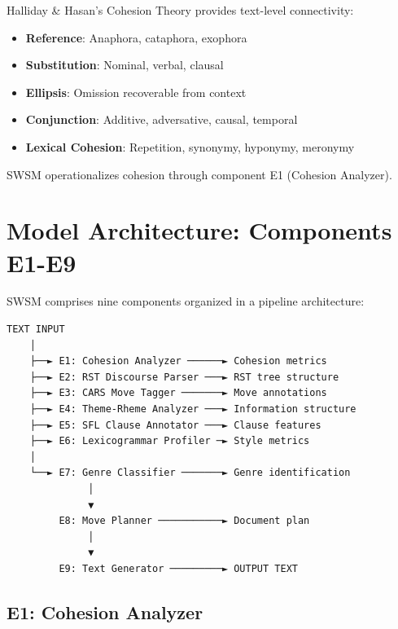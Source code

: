 Halliday \& Hasan's Cohesion Theory \citep{halliday1976cohesion} provides text-level connectivity:

\begin{itemize}
    \item \textbf{Reference}: Anaphora, cataphora, exophora
    \item \textbf{Substitution}: Nominal, verbal, clausal
    \item \textbf{Ellipsis}: Omission recoverable from context
    \item \textbf{Conjunction}: Additive, adversative, causal, temporal
    \item \textbf{Lexical Cohesion}: Repetition, synonymy, hyponymy, meronymy
\end{itemize}

SWSM operationalizes cohesion through component E1 (Cohesion Analyzer).


\section{Model Architecture: Components E1-E9}
\label{sec:sw-architecture}

SWSM comprises nine components organized in a pipeline architecture:

\begin{tcolorbox}[colback=green!5!white, colframe=green!75!black, title=SWSM Component Pipeline]
\begin{verbatim}
TEXT INPUT
    │
    ├──► E1: Cohesion Analyzer ──────► Cohesion metrics
    ├──► E2: RST Discourse Parser ───► RST tree structure
    ├──► E3: CARS Move Tagger ───────► Move annotations
    ├──► E4: Theme-Rheme Analyzer ───► Information structure
    ├──► E5: SFL Clause Annotator ───► Clause features
    ├──► E6: Lexicogrammar Profiler ─► Style metrics
    │
    └──► E7: Genre Classifier ───────► Genre identification
              │
              ▼
         E8: Move Planner ───────────► Document plan
              │
              ▼
         E9: Text Generator ─────────► OUTPUT TEXT
\end{verbatim}
\end{tcolorbox}

\subsection{E1: Cohesion Analyzer}
\label{sec:sw-e1}

